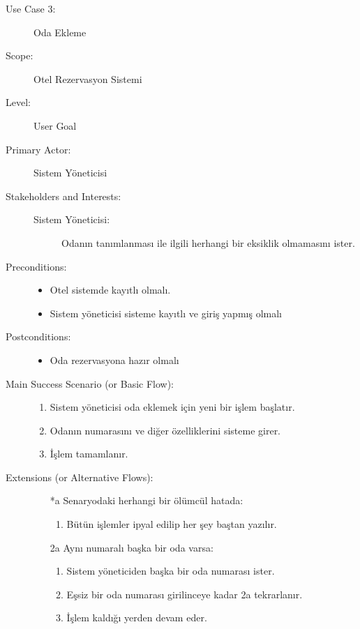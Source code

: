 \documentclass[12pt,a4paper]{report}
\begin{document}
\newpage
\begin{description}
\item[Use Case 3:] Oda Ekleme \\
\item[Scope:] Otel Rezervasyon Sistemi
\item[Level:] User Goal
\item[Primary Actor:] Sistem Yöneticisi 
\item[Stakeholders and Interests:] \hspace{10 mm}
\begin{description} 
\item[Sistem Yöneticisi:] Odanın tanımlanması ile ilgili herhangi bir eksiklik olmamasını ister.
\end{description}
\item[Preconditions:] \hspace{10mm}
\begin{itemize}
\item Otel sistemde kayıtlı olmalı.
\item Sistem yöneticisi sisteme kayıtlı ve giriş yapmış olmalı
\end{itemize}

\item[Postconditions:] \hspace{10mm}
\begin{itemize}
\item Oda rezervasyona hazır olmalı
\end{itemize}
\item[Main Success Scenario (or Basic Flow):] \hspace{10mm}
\begin{enumerate}
\item Sistem yöneticisi oda eklemek için yeni bir işlem başlatır.
\item Odanın numarasını ve diğer özelliklerini sisteme girer.
\item İşlem tamamlanır.
\end{enumerate}
\item[Extensions (or Alternative Flows):] \hspace{10mm}
\begin{itemize}
\item[*a] Senaryodaki herhangi bir ölümcül hatada:
    \begin{enumerate}
    \item Bütün işlemler ipyal edilip her şey baştan yazılır.
    \end{enumerate}
\item[2a] Aynı numaralı başka bir oda varsa:
    \begin{enumerate}
    \item Sistem yöneticiden başka bir oda numarası ister.
    \item Eşsiz bir oda numarası girilinceye kadar 2a tekrarlanır.
    \item İşlem kaldığı yerden devam eder.
    \end{enumerate}
\end{itemize}
\end{description}
\end{document}
